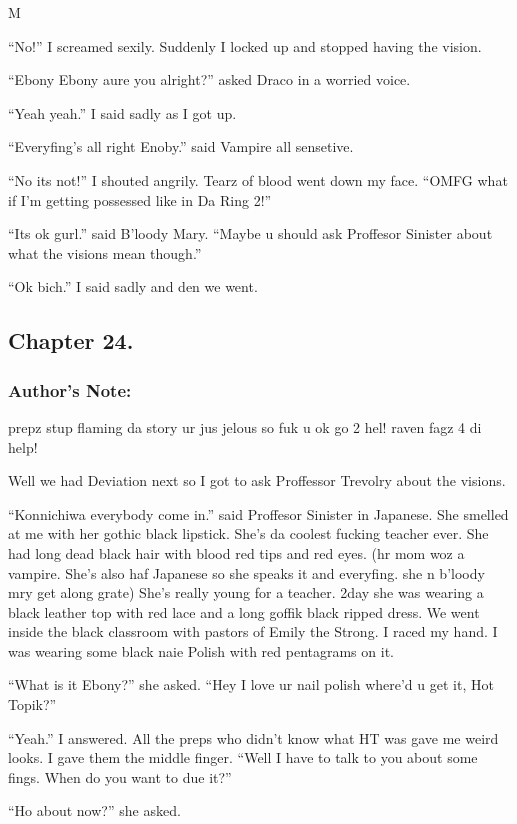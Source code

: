 M\documentclass{article}
\begin{document}
“No!” I screamed sexily. Suddenly I locked up and stopped having the vision.

“Ebony Ebony aure you alright?” asked Draco in a worried voice.

“Yeah yeah.” I said sadly as I got up.

“Everyfing’s all right Enoby.” said Vampire all sensetive.

“No its not!” I shouted angrily. Tearz of blood went down my face. “OMFG what if I’m getting possessed like in Da Ring 2!”

“Its ok gurl.” said B’loody Mary. “Maybe u should ask Proffesor Sinister about what the visions mean though.”

“Ok bich.” I said sadly and den we went.

\clearpage\nolinenumbers
\subsection*{Chapter 24.}

\subsubsection*{Author's Note: }prepz stup flaming da story ur jus jelous so fuk u ok go 2 hel! raven fagz 4 di help!

\textbreak
\linenumbers\resetlinenumber

Well we had Deviation next so I got to ask Proffessor Trevolry about the visions.

“Konnichiwa everybody come in.” said Proffesor Sinister in Japanese. She smelled at me with her gothic black lipstick. She’s da coolest fucking teacher ever. She had long dead black hair with blood red tips and red eyes. (hr mom woz a vampire. She’s also haf Japanese so she speaks it and everyfing. she n b’loody mry get along grate) She’s really young for a teacher. 2day she was wearing a black leather top with red lace and a long goffik black ripped dress. We went inside the black classroom with pastors of Emily the Strong. I raced my hand. I was wearing some black naie Polish with red pentagrams on it.

“What is it Ebony?” she asked. “Hey I love ur nail polish where’d u get it, Hot Topik?”

“Yeah.” I answered. All the preps who didn’t know what HT was gave me weird looks. I gave them the middle finger. “Well I have to talk to you about some fings. When do you want to due it?”

“Ho about now?” she asked.
\end{document}
